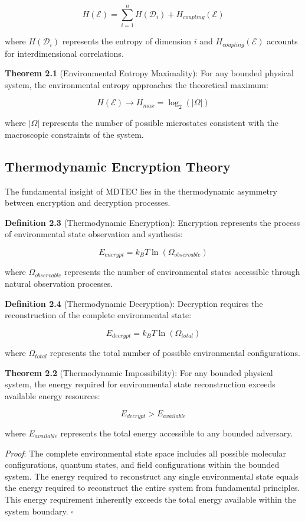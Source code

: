 \documentclass[12pt]{article}
\begin{document}
$$H(\mathcal{E}) = \sum_{i=1}^{n} H(\mathcal{D}_i) + H_{coupling}(\mathcal{E})$$

where $H(\mathcal{D}_i)$ represents the entropy of dimension $i$ and $H_{coupling}(\mathcal{E})$ accounts for interdimensional correlations.

\textbf{Theorem 2.1} (Environmental Entropy Maximality): For any bounded physical system, the environmental entropy approaches the theoretical maximum:

$$H(\mathcal{E}) \to H_{max} = \log_2(|\Omega|)$$

where $|\Omega|$ represents the number of possible microstates consistent with the macroscopic constraints of the system.

\subsection{Thermodynamic Encryption Theory}

The fundamental insight of MDTEC lies in the thermodynamic asymmetry between encryption and decryption processes.

\textbf{Definition 2.3} (Thermodynamic Encryption): Encryption represents the process of environmental state observation and synthesis:

$$E_{encrypt} = k_B T \ln(\Omega_{observable})$$

where $\Omega_{observable}$ represents the number of environmental states accessible through natural observation processes.

\textbf{Definition 2.4} (Thermodynamic Decryption): Decryption requires the reconstruction of the complete environmental state:

$$E_{decrypt} = k_B T \ln(\Omega_{total})$$

where $\Omega_{total}$ represents the total number of possible environmental configurations.

\textbf{Theorem 2.2} (Thermodynamic Impossibility): For any bounded physical system, the energy required for environmental state reconstruction exceeds available energy resources:

$$E_{decrypt} > E_{available}$$

where $E_{available}$ represents the total energy accessible to any bounded adversary.

\textit{Proof}: The complete environmental state space includes all possible molecular configurations, quantum states, and field configurations within the bounded system. The energy required to reconstruct any single environmental state equals the energy required to reconstruct the entire system from fundamental principles. This energy requirement inherently exceeds the total energy available within the system boundary. $\square$
\end{document}
